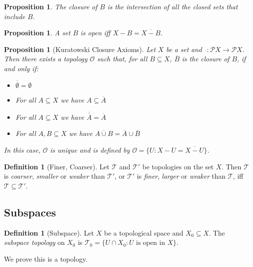 \documentclass{book}
\newtheorem{prop}[ax]{Proposition}
\theoremstyle{definition}
\newtheorem{df}[ax]{Definition}
\begin{document}
\begin{prop}
The closure of $B$ is the intersection of all the closed sets that include $B$.
\end{prop}

\begin{prop}
A set $B$ is open iff $X - B = \overline{X - B}$.
\end{prop}

\begin{prop}[Kuratowski Closure Axioms]
Let $X$ be a set and $\overline{\ } : \mathcal{P} X \rightarrow \mathcal{P} X$. Then there exists a topology $\mathcal{O}$ such that, for all $B \subseteq X$, $\overline{B}$ is the closure of $B$, if and only if:
\begin{itemize}
\item $\overline{\emptyset} = \emptyset$
\item For all $A \subseteq X$ we have $A \subseteq \overline{A}$
\item For all $A \subseteq X$ we have $\overline{\overline{A}} = \overline{A}$
\item For all $A, B \subseteq X$ we have $\overline{A \cup B} = \overline{A} \cup \overline{B}$
\end{itemize}
In this case, $\mathcal{O}$ is unique and is defined by $\mathcal{O} = \{ U : X - U = \overline{X - U} \}$.
\end{prop}

\begin{df}[Finer, Coarser]
Let $\mathcal{T}$ and $\mathcal{T}'$ be topologies on the set $X$. Then $\mathcal{T}$ is \emph{coarser}, \emph{smaller} or \emph{weaker} than $\mathcal{T}'$, or $\mathcal{T}'$ is \emph{finer}, \emph{larger} or \emph{weaker} than $\mathcal{T}$, iff $\mathcal{T} \subseteq \mathcal{T}'$.
\end{df}

\subsection{Subspaces}

\begin{df}[Subspace]
Let $X$ be a topological space and $X_0 \subseteq X$. The \emph{subspace topology} on $X_0$ is $\mathcal{T}_0 = \{ U \cap X_0 : U \text{ is open in } X \}$.

We prove this is a topology.
\end{df}
\end{document}
